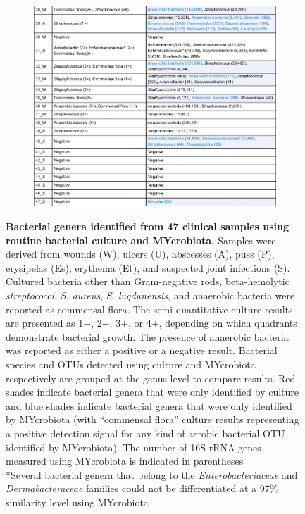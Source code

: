 \begin{figure}\ContinuedFloat
\begin{subfigure}{\textwidth}
 \centering
 \includegraphics[scale=0.5]{chapters/images/mycrobiota/mycrobiota-table1b.png}
\end{subfigure}
\caption{\textbf{Bacterial genera identified from 47 clinical samples using routine bacterial culture and MYcrobiota.} Samples were derived from wounds (W), ulcers (U), abscesses (A), puss (P), erysipelas (Es), erythema (Et), and suspected joint infections (S). Cultured bacteria other than Gram-negative rods, beta-hemolytic \textit{streptococci}, \textit{S. aureus}, \textit{S. lugdunensis}, and anaerobic bacteria were reported as commensal flora. The semi-quantitative culture results are presented as 1+, 2+, 3+, or 4+, depending on which quadrants demonstrate bacterial growth. The presence of anaerobic bacteria was reported as either a positive or a negative result. Bacterial species and OTUs detected using culture and MYcrobiota respectively are grouped at the genus level to compare results. Red shades indicate bacterial genera that were only identified by culture and blue shades indicate bacterial genera that were only identified by MYcrobiota (with “commensal flora” culture results representing a positive detection signal for any kind of aerobic bacterial OTU identified by MYcrobiota). The number of 16S rRNA genes measured using MYcrobiota is indicated in parentheses \\ *Several bacterial genera that belong to the \textit{Enterobacteriaceae} and \textit{Dermabacteraceae} families could not be differentiated at a 97\% similarity level using MYcrobiota}\label{table:samples}
\end{figure}

